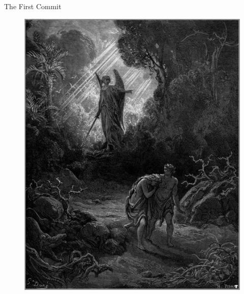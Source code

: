 \documentclass[12pt,xcolor=x11names]{beamer}
\begin{document}
\begin{frame}{The First Commit}
    \begin{figure}
        \centering \includegraphics[height=0.75\textheight]{castout.png}
    \end{figure}
\end{frame}
\end{document}
